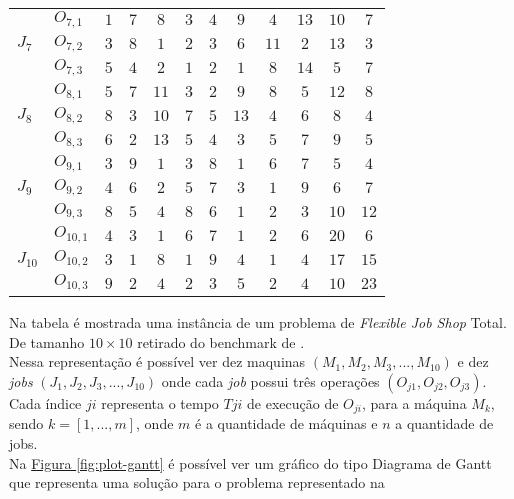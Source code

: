 \begin{table}[htb]
\begin{tabular}[t]{llcccccccccc}
\multirow{3}{*}{$J_7$}&$O_{7,1}$ & $1$ & $7$ & $8$ & $3$ & $4$ & $9$ & $4$ & $13$ & $10$ & $7$\\
&$O_{7,2}$ & $3$ & $8$ & $1$ & $2$ & $3$ & $6$ & $11$ & $2$ & $13$ & $3$\\
&$O_{7,3}$ & $5$ & $4$ & $2$ & $1$ & $2$ & $1$ & $8$ & $14$ & $5$ & $7$\\
\multirow{3}{*}{$J_8$}&$O_{8,1}$ & $5$ & $7$ & $11$ & $3$ & $2$ & $9$ & $8$ & $5$ & $12$ & $8$\\
&$O_{8,2}$ & $8$ & $3$ & $10$ & $7$ & $5$ & $13$ & $4$ & $6$ & $8$ & $4$\\
&$O_{8,3}$ & $6$ & $2$ & $13$ & $5$ & $4$ & $3$ & $5$ & $7$ & $9$ & $5$\\
\multirow{3}{*}{$J_9$}&$O_{9,1}$ & $3$ & $9$ & $1$ & $3$ & $8$ & $1$ & $6$ & $7$ & $5$ & $4$\\
&$O_{9,2}$ & $4$ & $6$ & $2$ & $5$ & $7$ & $3$ & $1$ & $9$ & $6$ & $7$\\
&$O_{9,3}$ & $8$ & $5$ & $4$ & $8$ & $6$ & $1$ & $2$ & $3$ & $10$ & $12$\\
\multirow{3}{*}{$J_{10}$}&$O_{10,1}$ & $4$ & $3$ & $1$ & $6$ & $7$ & $1$ & $2$ & $6$ & $20$ & $6$\\
&$O_{10,2}$ & $3$ & $1$ & $8$ & $1$ & $9$ & $4$ & $1$ & $4$ & $17$ & $15$\\
&$O_{10,3}$ & $9$ & $2$ & $4$ & $2$ & $3$ & $5$ & $2$ & $4$ & $10$ & $23$\\
\hline
    \end{tabular}
\end{table}
Na tabela é mostrada uma instância de um problema de \textit{Flexible Job Shop} Total. De tamanho $10\times10$ retirado do benchmark de \cite{Kacem2002}.\\
%
\indent Nessa representação é possível ver dez maquinas $(M_1, M_2, M_3, ..., M_{10})$ e dez \textit{jobs} $(J_1, J_2, J_3, ..., J_{10})$ onde cada \textit{job} possui três operações $(O_{j1}, O_{j2}, O_{j3})$.\\
%
Cada índice $ji$ representa o tempo $T{ji}$ de execução de $O_{ji}$, para a máquina $M_k$, 
sendo $k=[1, ..., m]$, onde $m$ é a quantidade de máquinas e $n$ a quantidade de jobs.\\
\indent Na 
\hyperref[fig:plot-gantt]{Figura \ref{fig:plot-gantt}} 
é possível ver um gráfico do tipo Diagrama de Gantt que representa uma solução para o problema representado na 
